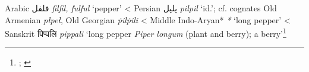 \begin{etymology}\label{ety:fulful}
Arabic {فلفل} \textit{filfil, fulful} `pepper'
< Persian {پلپل} \textit{pilpil} `id.'; cf. cognates Old Armenian  \textit{płpeł}, Old Georgian  \textit{ṗilṗili}
< Middle Indo-Aryan* \textit{*} `long pepper'
< Sanskrit {पिप्पलि } \textit{pippali} `long pepper \textit{Piper longum} (plant and berry); a berry'\footnote{\textcite[2434]{lane_arabic-english_1863}; \textcite{sq}}
\end{etymology}